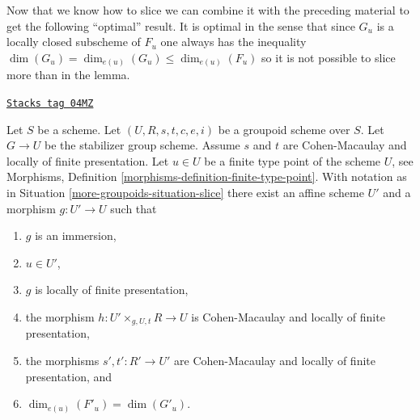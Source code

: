 Now that we know how to slice we can combine it with the preceding material
to get the following ``optimal'' result. It is optimal in the sense that
since $G_u$ is a locally closed subscheme of $F_u$ one always has the
inequality $\dim(G_u) = \dim_{e(u)}(G_u) \leq \dim_{e(u)}(F_u)$ so it
is not possible to slice more than in the lemma.

\begin{lemma}
\label{more-groupoids-lemma-max-slice}
\href{https://stacks.math.columbia.edu/tag/04MZ}{\texttt{Stacks tag 04MZ}}

Let $S$ be a scheme.
Let $(U, R, s, t, c, e, i)$ be a groupoid scheme over $S$.
Let $G \to U$ be the stabilizer group scheme.
Assume $s$ and $t$ are Cohen-Macaulay and locally of finite presentation.
Let $u \in U$ be a finite type point of the scheme $U$, see
Morphisms, Definition \ref{morphisms-definition-finite-type-point}.
With notation as in
Situation \ref{more-groupoids-situation-slice}
there exist an affine scheme $U'$ and a morphism $g : U' \to U$ such that
\begin{enumerate}
\item $g$ is an immersion,
\item $u \in U'$,
\item $g$ is locally of finite presentation,
\item the morphism $h : U' \times_{g, U, t} R \longrightarrow U$
is Cohen-Macaulay and locally of finite presentation,
\item the morphisms $s', t' : R' \to U'$ are Cohen-Macaulay and
locally of finite presentation, and
\item $\dim_{e(u)}(F'_u) = \dim(G'_u)$.
\end{enumerate}
\end{lemma}

